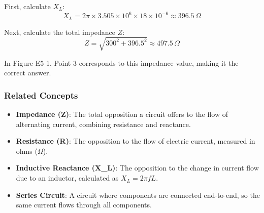First, calculate \( X_L \):
\[
X_L = 2\pi \times 3.505 \times 10^6 \times 18 \times 10^{-6} \approx 396.5 \, \Omega
\]

Next, calculate the total impedance \( Z \):
\[
Z = \sqrt{300^2 + 396.5^2} \approx 497.5 \, \Omega
\]

In Figure E5-1, Point 3 corresponds to this impedance value, making it the correct answer.

\subsubsection{Related Concepts}
\begin{itemize}
    \item \textbf{Impedance (Z)}: The total opposition a circuit offers to the flow of alternating current, combining resistance and reactance.
    \item \textbf{Resistance (R)}: The opposition to the flow of electric current, measured in ohms ($\Omega$).
    \item \textbf{Inductive Reactance (X\_L)}: The opposition to the change in current flow due to an inductor, calculated as \( X_L = 2\pi f L \).
    \item \textbf{Series Circuit}: A circuit where components are connected end-to-end, so the same current flows through all components.
\end{itemize}

